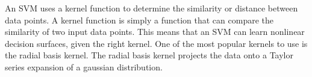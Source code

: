 An SVM uses a kernel function to determine the similarity or distance between data points. A kernel function is simply a function that can compare the similarity of two input data points. This means that an SVM can learn nonlinear decision surfaces, given the right kernel. One of the most popular kernels to use is the radial basis kernel. The radial basis kernel projects the data onto a Taylor series expansion of a gaussian distribution.
